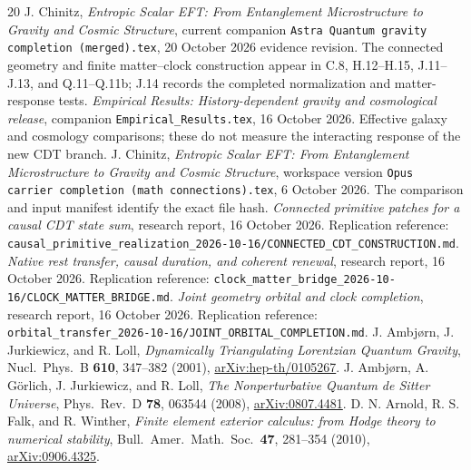 \documentclass[11pt]{article}
\theoremstyle{remark}
\numberwithin{equation}{section}
\begin{document}








\appendix

\begingroup
\small
\setlength{\parskip}{0pt}
\begin{thebibliography}{20}
\setlength{\itemsep}{3pt}
 J. Chinitz, \emph{Entropic Scalar EFT: From Entanglement Microstructure to Gravity and Cosmic Structure}, current companion \texttt{Astra Quantum gravity completion (merged).tex}, 20 October 2026 evidence revision. The connected geometry and finite matter--clock construction appear in C.8, H.12--H.15, J.11--J.13, and Q.11--Q.11b; J.14 records the completed normalization and matter-response tests.
 \emph{Empirical Results: History-dependent gravity and cosmological release}, companion \texttt{Empirical\_Results.tex}, 16 October 2026. Effective galaxy and cosmology comparisons; these do not measure the interacting response of the new CDT branch.
 J. Chinitz, \emph{Entropic Scalar EFT: From Entanglement Microstructure to Gravity and Cosmic Structure}, workspace version \texttt{Opus carrier completion (math connections).tex}, 6 October 2026. The comparison and input manifest identify the exact file hash.
 \emph{Connected primitive patches for a causal CDT state sum}, research report, 16 October 2026. Replication reference: \nolinkurl{causal_primitive_realization_2026-10-16/CONNECTED_CDT_CONSTRUCTION.md}.
 \emph{Native rest transfer, causal duration, and coherent renewal}, research report, 16 October 2026. Replication reference: \nolinkurl{clock_matter_bridge_2026-10-16/CLOCK_MATTER_BRIDGE.md}.
 \emph{Joint geometry orbital and clock completion}, research report, 16 October 2026. Replication reference: \nolinkurl{orbital_transfer_2026-10-16/JOINT_ORBITAL_COMPLETION.md}.
 J. Ambj{\o}rn, J. Jurkiewicz, and R. Loll, \emph{Dynamically Triangulating Lorentzian Quantum Gravity}, Nucl.\ Phys.\ B \textbf{610}, 347--382 (2001), \href{https://arxiv.org/abs/hep-th/0105267}{arXiv:hep-th/0105267}.
 J. Ambj{\o}rn, A. G{\"o}rlich, J. Jurkiewicz, and R. Loll, \emph{The Nonperturbative Quantum de Sitter Universe}, Phys.\ Rev.\ D \textbf{78}, 063544 (2008), \href{https://arxiv.org/abs/0807.4481}{arXiv:0807.4481}.
 D. N. Arnold, R. S. Falk, and R. Winther, \emph{Finite element exterior calculus: from Hodge theory to numerical stability}, Bull.\ Amer.\ Math.\ Soc.\ \textbf{47}, 281--354 (2010), \href{https://arxiv.org/abs/0906.4325}{arXiv:0906.4325}.

\end{thebibliography}
\end{document}
